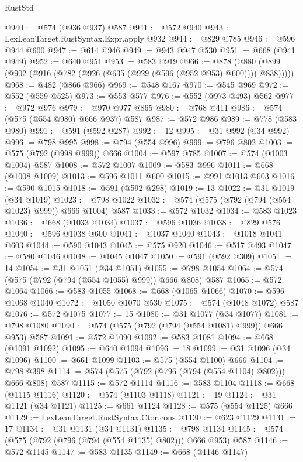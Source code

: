\begin{lexlean}{RustStd}
\begin{coremodule}
@940 := @574 (@936 @937) @587
@941 := @572 @940
@943 := LexLeanTarget.RustSyntax.Expr.apply @932
@944 := @829 @785
@946 := @596 @944 @600
@947 := @614 @946
@949 := @943 @947 @530
@951 := @668 (@941 @949)
@952 := @640 @951
@953 := @583 @919
@966 := @878 (@880 (@899 (@902 (@916 (@782 (@926 (@635 (@929 (@596 (@952 @953) @600)))) @838)))))
@968 := @482 (@866 @966)
@969 := @548 @167
@970 := @545 @969
@972 := @552 (@559 @525)
@973 := @553 @577
@976 := @552 (@973 @493) @562
@977 := @972 @976
@979 := @970 @977 @865
@980 := @768 @411
@986 := @574 (@575 (@554 @980) @666 @937) @587
@987 := @572 @986
@989 := @778 (@583 @980)
@991 := @591 (@592 @287)
@992 := 12
@995 := @31 @992 (@34 @992)
@996 := @798 @995
@998 := @794 (@554 @996)
@999 := @796 @802
@1003 := @575 (@792 (@998 @999)) @666
@1004 := @597 @785
@1007 := @574 (@1003 @1004) @587
@1008 := @572 @1007
@1009 := @583 @996
@1011 := @668 (@1008 @1009)
@1013 := @596 @1011 @600
@1015 := @991 @1013 @603
@1016 := @590 @1015
@1018 := @591 (@592 @298)
@1019 := 13
@1022 := @31 @1019 (@34 @1019)
@1023 := @798 @1022
@1032 := @574 (@575 (@792 (@794 (@554 @1023) @999)) @666 @1004) @587
@1033 := @572 @1032
@1034 := @583 @1023
@1036 := @668 (@1033 @1034)
@1037 := @596 @1036
@1038 := @829 @576
@1040 := @596 @1038 @600
@1041 := @1037 @1040
@1043 := @1018 @1041 @603
@1044 := @590 @1043
@1045 := @575 @920
@1046 := @517 @493
@1047 := @580 @1046
@1048 := @1045 @1047
@1050 := @591 (@592 @309)
@1051 := 14
@1054 := @31 @1051 (@34 @1051)
@1055 := @798 @1054
@1064 := @574 (@575 (@792 (@794 (@554 @1055) @999)) @666 @808) @587
@1065 := @572 @1064
@1066 := @583 @1055
@1068 := @668 (@1065 @1066)
@1070 := @596 @1068 @1040
@1072 := @1050 @1070 @530
@1075 := @574 (@1048 @1072) @587
@1076 := @572 @1075
@1077 := 15
@1080 := @31 @1077 (@34 @1077)
@1081 := @798 @1080
@1090 := @574 (@575 (@792 (@794 (@554 @1081) @999)) @666 @953) @587
@1091 := @572 @1090
@1092 := @583 @1081
@1094 := @668 (@1091 @1092)
@1095 := @640 @1094
@1096 := 18
@1099 := @31 @1096 (@34 @1096)
@1100 := @661 @1099
@1103 := @575 (@554 @1100) @666
@1104 := @798 @398
@1114 := @574 (@575 (@792 (@796 (@794 (@554 @1104) @802))) @666 @808) @587
@1115 := @572 @1114
@1116 := @583 @1104
@1118 := @668 (@1115 @1116)
@1120 := @574 (@1103 @1118)
@1121 := 19
@1124 := @31 @1121 (@34 @1121)
@1125 := @661 @1124
@1128 := @575 (@554 @1125) @666
@1129 := LexLeanTarget.RustSyntax.Ctor.cons
@1130 := @623 @1129
@1131 := 17
@1134 := @31 @1131 (@34 @1131)
@1135 := @798 @1134
@1145 := @574 (@575 (@792 (@796 (@794 (@554 @1135) @802))) @666 @953) @587
@1146 := @572 @1145
@1147 := @583 @1135
@1149 := @668 (@1146 @1147)

\end{coremodule}
\end{lexlean}
